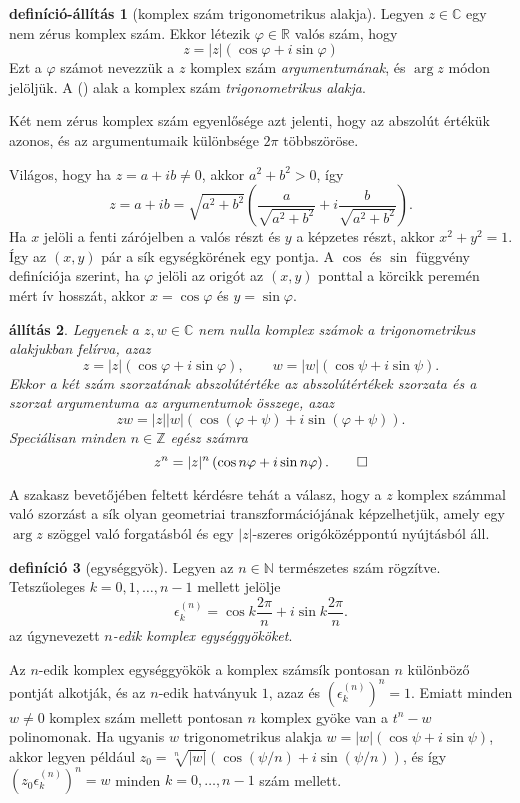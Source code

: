 \documentclass[9pt, showtrims]{memoir}
\makeatletter
\renewenvironment{proof}[1][\proofname]
    {\par\pushQED{\qed}%
    \normalfont \topsep6\p@\@plus6\p@\relax
    \trivlist
    \item[\hskip\labelsep
        \itshape
    #1\@addpunct{:}]\ignorespaces}
    {\popQED\endtrivlist\@endpefalse}
\theoremstyle{plain}
\newtheorem{proposition}{állítás}[section]
\theoremstyle{remark}
\theoremstyle{definition}
\newtheorem{definition}[proposition]{definíció}
\newtheorem{defprop}[proposition]{definíció-állítás}
\renewcommand{\mathbf}{\mathbb}
\makeatother
\begin{document}
\begin{defprop}[komplex szám trigonometrikus alakja]
    Legyen $z\in \mathbf{C}$ egy nem zérus komplex szám.
    Ekkor létezik $\varphi\in\mathbf{R}$ valós szám, hogy
    \[
        z=
        |z|\left( \cos\varphi+i\sin\varphi \right)\tag{\dag}
    \]
    Ezt a $\varphi$ számot nevezzük a $z$ komplex szám \emph{argumentumának}, és $\arg z$ módon jelöljük.
    A (\dag) alak a komplex szám \emph{trigonometrikus alakja}.

    Két nem zérus komplex szám egyenlősége azt jelenti, hogy az abszolút értékük azonos,
    és az argumentumaik különbsége $2\pi$ többszöröse.
\end{defprop}
\begin{proof}
    Világos, hogy ha $z=a+ib\neq 0$, akkor $a^2+b^2>0$, így
    \[
        z=a+ib
        =
        \sqrt{a^2+b^2}\left( \frac{a}{\sqrt{a^2+b^2}}+i\frac{b}{\sqrt{a^2+b^2}} \right).
    \]
    Ha $x$ jelöli a fenti zárójelben a valós részt és $y$ a képzetes részt,
    akkor $x^2+y^2=1$.
    Így az $\left( x,y \right)$ pár a sík egységkörének egy pontja.
    A $\cos$ és $\sin$ függvény definíciója szerint,
    ha $\varphi$ jelöli az origót az $\left( x,y \right)$ 
    ponttal a körcikk peremén mért ív hosszát,
    akkor $x=\cos\varphi$ és $y=\sin\varphi$.
\end{proof}
\begin{proposition}
    Legyenek a $z,w\in \mathbf{C}$ nem nulla komplex számok a trigonometrikus alakjukban felírva, 
    azaz
    \[
        z=|z|\left( \cos\varphi+i\sin\varphi \right),\qquad 
        w=|w|\left( \cos\psi+i\sin\psi \right).
    \]
    Ekkor a két szám szorzatának abszolútértéke az abszolútértékek szorzata
    és a szorzat argumentuma az argumentumok összege, azaz
    \[
        zw=
        |z||w|\left( \cos\left( \varphi+\psi \right)+i\sin\left( \varphi+\psi \right) \right).
    \]
    Speciálisan minden $n\in\mathbf{Z}$ egész számra
    \[
        z^n=|z|^n\left( \cos n\varphi+i\sin n\varphi \right).\qedhere
    \]
\end{proposition}
A szakasz bevetőjében feltett kérdésre tehát a válasz,
hogy a $z$ komplex számmal való szorzást a sík olyan geometriai transzformációjának képzelhetjük,
amely egy $\arg z$ szöggel való forgatásból és egy $|z|$-szeres origóközéppontú nyújtásból áll.
\begin{definition}[egységgyök]
    Legyen az $n\in\mathbb{N}$ természetes szám rögzítve.
    Tetszűoleges $k=0,1,\dots,n-1$ mellett jelölje
    \[
        \epsilon_k^{(n)}=\cos k\frac{2\pi}{n}+i\sin k\frac{2\pi}{n}.
    \]
    az úgynevezett \emph{$n$-edik komplex egységgyököket}.
\end{definition}
Az $n$-edik komplex egységgyökök a komplex számsík pontosan $n$ különböző pontját alkotják,
és az $n$-edik hatványuk $1$, azaz 
és $(\epsilon_k^{(n)})^n=1$.
Emiatt minden $w\neq 0$ komplex szám mellett pontosan $n$ komplex gyöke van a $t^n-w$ polinomonak.
Ha ugyanis $w$ trigonometrikus alakja $w=|w|\left( \cos\psi+i\sin\psi \right)$,
akkor legyen például $z_0=\sqrt[n]{|w|}\left( \cos(\psi/n)+i\sin(\psi/n) \right)$,
és így $(z_0\epsilon_k^{(n)})^n=w$ minden $k=0,\dots,n-1$ szám mellett.
\end{document}
